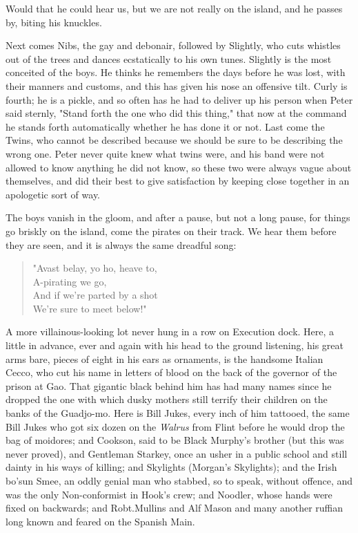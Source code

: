 Would that he could hear us,
but we are not really on the island, and he passes by, biting his knuckles.

Next comes Nibs, the gay and debonair,
followed by Slightly, who cuts whistles out of the trees and dances ecstatically to his own tunes.
Slightly is the most conceited of the boys.
He thinks he remembers the days before he was lost, with their manners and customs,
and this has given his nose an offensive tilt.
Curly is fourth;
he is a pickle,
and so often has he had to deliver up his person when Peter said sternly,
"Stand forth the one who did this thing,"
that now at the command he stands forth automatically whether he has done it or not.
Last come the Twins, who cannot be described because we should be sure to be describing the wrong one.
Peter never quite knew what twins were, and his band were not allowed to know anything he did not know,
so these two were always vague about themselves,
and did their best to give satisfaction by keeping close together in an apologetic sort of way.

The boys vanish in the gloom,
and after a pause, but not a long pause, for things go briskly on the island,
come the pirates on their track.
We hear them before they are seen, and it is always the same dreadful song:

\begin{verse}
	"Avast belay, yo ho, heave to,\\
	A-pirating we go,\\
	And if we're parted by a shot\\
	We're sure to meet below!"
\end{verse}

A more villainous-looking lot never hung in a row on Execution dock.
Here, a little in advance, ever and again with his head to the ground listening,
his great arms bare, pieces of eight in his ears as ornaments,
is the handsome Italian Cecco,
who cut his name in letters of blood on the back of the governor of the prison at Gao.
That gigantic black behind him has had many names
since he dropped the one with which dusky mothers still terrify their children on the banks of the Guadjo-mo.
Here is Bill Jukes, every inch of him tattooed,
the same Bill Jukes who got six dozen on the \emph{Walrus} from Flint before he would drop the bag of moidores;
and Cookson, said to be Black Murphy's brother (but this was never proved),
and Gentleman Starkey, once an usher in a public school and still dainty in his ways of killing;
and Skylights (Morgan's Skylights);
and the Irish bo'sun Smee,
an oddly genial man who stabbed, so to speak, without offence,
and was the only Non-conformist in Hook's crew;
and Noodler, whose hands were fixed on backwards;
and Robt.\@ Mullins and Alf Mason and many another ruffian long known and feared on the Spanish Main.

